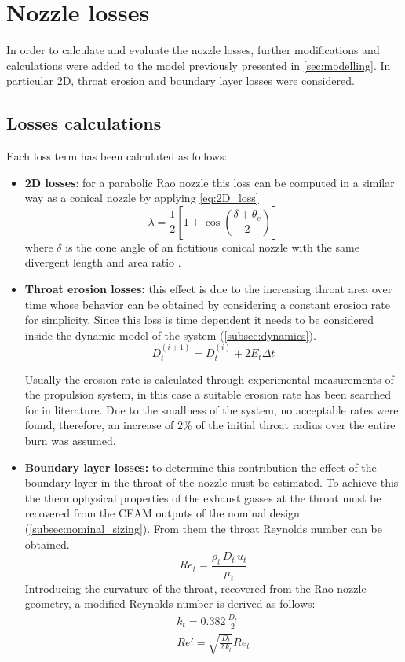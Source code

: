 \section{Nozzle losses}
\label{sec:nozzle_losses}

In order to calculate and evaluate the nozzle losses, further modifications and calculations were added to the model previously presented in \autoref{sec:modelling}.
In particular 2D, throat erosion and boundary layer losses were considered.

\subsection{Losses calculations}  

Each loss term has been calculated as follows:
\begin{itemize}
    \item \textbf{2D losses}: for a parabolic Rao nozzle this loss can be computed in a similar way as a conical nozzle by applying \autoref{eq:2D_loss}
    \begin{equation}
        \lambda = \frac{1}{2} \left[ 1 + \cos \left( \frac{\delta + \theta_e}{2}\right)\right]
        \label{eq:2D_loss}
    \end{equation}
    where $\delta$ is the cone angle of an fictitious conical nozzle with the same divergent length and area ratio \cite{Sutton}.
    \item \textbf{Throat erosion losses:} this effect is due to the increasing throat area over time whose behavior can be obtained by considering a constant erosion rate for simplicity. Since this loss is time dependent it needs to be considered inside the dynamic model of the system (\autoref{subsec:dynamics}).
    \begin{equation}
        D_t^{(i+1)} = D_t^{(i)} + 2 E_t \Delta t
    \end{equation}

    Usually the erosion rate is calculated through experimental measurements of the propulsion system, in this case a suitable erosion rate has been searched for in literature. Due to the smallness of the system, no acceptable rates were found, therefore, an increase of 2\% of the initial throat radius over the entire burn was assumed.\cite{Sutton}\cite{tesi_malesia}
    \item \textbf{Boundary layer losses:} to determine this contribution the effect of the boundary layer in the throat of the nozzle must be estimated. To achieve this the thermophysical properties of the exhaust gasses at the throat must be recovered from the CEAM outputs of the nominal design (\autoref{subsec:nominal_sizing}). From them the throat Reynolds number can be obtained.
    \begin{equation}
        Re_t = \frac{\rho_t \, D_t \, u_t}{\mu_t}
    \end{equation}
Introducing the curvature of the throat, recovered from the Rao nozzle geometry, a modified Reynolds number is derived as follows:
    \begin{gather}
        k_t = 0.382 \, \frac{D_t}{2} \\
        Re'=\sqrt{\frac{D_t}{2 \, k_t}}Re_t
    \end{gather}  


\end{itemize}

